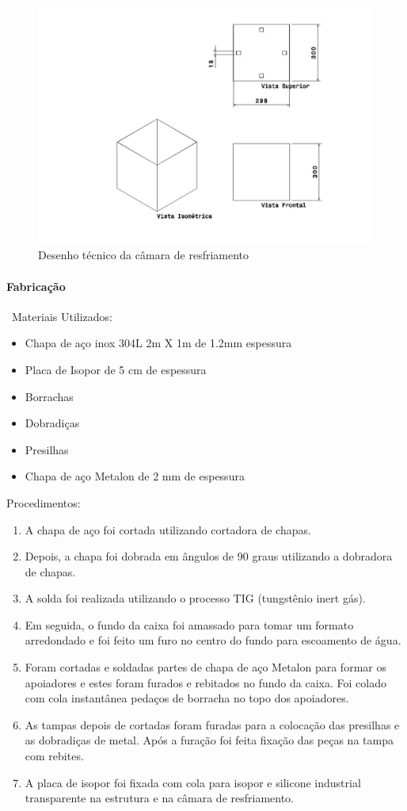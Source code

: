 \begin{figure}[H]
\centering
\includegraphics[width=16cm]{figuras/desenhocamara.png}
\caption{Desenho técnico da câmara de resfriamento}
\end{figure}


\paragraph*{Fabricação}\
Materiais Utilizados:

\begin{itemize}
\item Chapa de aço inox 304L 2m X 1m de 1.2mm espessura
\item Placa de Isopor de 5 cm de espessura
\item Borrachas
\item Dobradiças
\item Presilhas
\item Chapa de aço Metalon de 2 mm de espessura
\end{itemize}

Procedimentos:

\begin{enumerate}
\item A chapa de aço foi cortada utilizando cortadora de chapas.
\item Depois, a chapa foi dobrada em ângulos de 90 graus utilizando a dobradora de chapas.
\item A solda foi realizada utilizando o processo TIG (tungstênio inert gás).
\item Em seguida, o fundo da caixa foi amassado para tomar um formato arredondado e foi feito um furo no centro do fundo para escoamento de água.
\item Foram cortadas e soldadas partes de chapa de aço Metalon para formar os apoiadores e estes foram furados e rebitados no fundo da caixa. Foi colado com cola instantânea pedaços de borracha no topo dos apoiadores.
\item As tampas depois de cortadas foram furadas para a colocação das presilhas e as dobradiças de metal. Após a furação foi feita fixação das peças na tampa com rebites.
\item A placa de isopor foi fixada com cola para isopor e silicone industrial transparente na estrutura e na câmara de resfriamento.
\end{enumerate}


